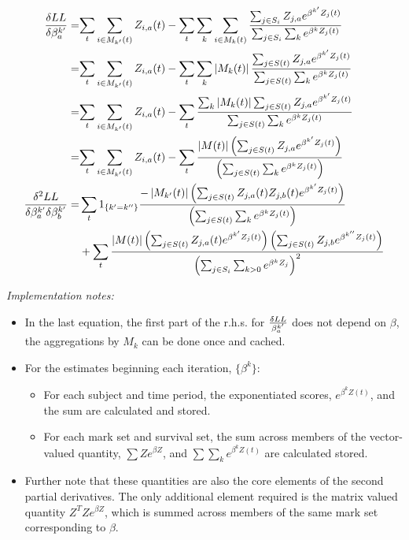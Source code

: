 \documentclass[10pt]{article}
\begin{document}
\begin{align*}
{\delta LL \over \delta \beta_a^{k'}}
    =&{\sum_t\sum_{i \in M_{k'}(t)} Z_{i,a}(t)} 
     -{\sum_t\sum_k\sum_{i\in M_k(t)}{\sum_{j\in S_i}Z_{j,a}e^{\beta^{k'}Z_j(t)}
            \over \sum_{j\in S_i} \sum_k e^{\beta^kZ_j(t)} } }\\
    =&{\sum_t\sum_{i \in M_{k'}(t)} Z_{i,a}(t)} 
     -{\sum_t\sum_k\left|{M_k(t)}\right|{\sum_{j\in S(t)}Z_{j,a}e^{\beta^{k'}Z_j(t)}
            \over \sum_{j\in S(t)} \sum_k e^{\beta^kZ_j(t)} } }\\
    =&{\sum_t\sum_{i \in M_{k'}(t)} Z_{i,a}(t)} 
     -\sum_t{\sum_k\left|{M_k(t)}\right|{\sum_{j\in S(t)}Z_{j,a}e^{\beta^{k'}Z_j(t)}}
            \over \sum_{j\in S(t)} \sum_k e^{\beta^kZ_j(t)}  }\\
    =&{\sum_t\sum_{i \in M_{k'}(t)} Z_{i,a}(t)} 
     -\sum_t{\left|{M(t)}\right|\left({\sum_{j\in S(t)}Z_{j,a}e^{\beta^{k'}Z_j(t)}}\right)
            \over \left({\sum_{j\in S(t)} \sum_k e^{\beta^kZ_j(t)} }\right) }\\
    {\delta^2 LL \over \delta \beta_a^{k'} \delta \beta_b^{k'}}
    =&\sum_t1_{\{k'=k''\}}{{-\left|{M_{k'}(t)}\right|
        \left({\sum_{j\in S(t)}Z_{j,a}(t)Z_{j,b}(t)e^{\beta^{k'}Z_j(t)}}\right)}
        \over \left({\sum_{j\in S(t)} \sum_ke^{\beta^kZ_j(t)}}\right) } \\
    &+\sum_t{\left|{M(t)}\right|\left({\sum_{j\in S(t)}Z_{j,a}(t)e^{\beta^{k'}Z_j(t)}}\right)\left({\sum_{j\in
    S(t)}Z_{j,b}e^{\beta^{k''}Z_j(t)}}\right)
    \over \left({\sum_{j\in S_i} \sum_{k>0}e^{\beta^kZ_j}}\right)^2 } \\
\end{align*}    


{\samepage
{\em Implementation notes:}
\begin{itemize}
    \item In the last equation, the first part of the r.h.s. for $\delta LL \over \beta_a^{k'}$ does not depend on $\beta$, the aggregations by $M_k$ can be
done once and cached.
\item For the estimates beginning each iteration, $\{\beta^k\}$:
    \begin{itemize}
        \item For each subject and time period, the exponentiated scores, ${e^{\beta^kZ(t)}}$, and the sum are calculated and stored.
        \item For each mark set and survival set, the sum across members of the vector-valued quantity, $\sum Z e^{\beta Z}$, and 
            $\sum \sum_k  e^{\beta^kZ(t)}$ are calculated stored.
    \end{itemize}
\item Further note that these quantities are also the core elements of the second partial derivatives.  The only additional element required
    is the matrix valued quantity $ Z^TZe^{\beta Z} $, which is summed across members of the same mark set corresponding to $\beta$.
\end{itemize}
}
\end{document}
